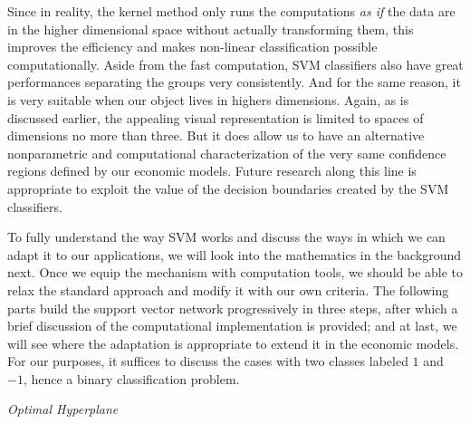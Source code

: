 \documentclass[12pt]{article}
\theoremstyle{definition}
\begin{document}
Since in reality, the kernel method only runs the computations \textit{as if} the data are in the higher dimensional space without actually transforming them, this improves the efficiency and makes non-linear classification possible computationally. Aside from the fast computation, SVM classifiers also have great performances separating the groups very consistently. And for the same reason, it is very suitable when our object lives in highers dimensions. Again, as is discussed earlier, the appealing visual representation is limited to spaces of dimensions no more than three. But it does allow us to have an alternative nonparametric and computational characterization of the very same confidence regions defined by our economic models. Future research along this line is appropriate to exploit the value of the decision boundaries created by the SVM classifiers.


To fully understand the way SVM works and discuss the ways in which we can adapt it to our applications, we will look into the mathematics in the background next. Once we equip the mechanism with computation tools, we should be able to relax the standard approach and modify it with our own criteria. The following parts build the support vector network progressively in three steps, after which a brief discussion of the computational implementation is provided; and at last, we will see where the adaptation is appropriate to extend it in the economic models. For our purposes, it suffices to discuss the cases with two classes labeled $1$ and $-1$, hence a binary classification problem. 


\vspace{0.3cm}
\noindent\textit{Optimal Hyperplane} 
\end{document}
